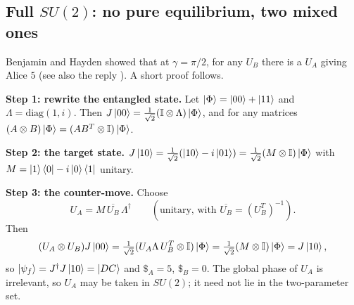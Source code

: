 \documentclass[11pt,a4paper]{article}
\begin{document}
\subsection{Full \texorpdfstring{$SU(2)$}{SU(2)}: no pure equilibrium, two mixed ones}\label{sec:fullsu2}
Benjamin and Hayden \cite{bh} showed that at $\gamma=\pi/2$, for any $U_B$ there is a $U_A$ giving Alice $5$ (see also the reply \cite{ewlreply}). A short proof follows.

\textbf{Step 1: rewrite the entangled state.} Let $\ket\Phi=\ket{00}+\ket{11}$ and $\Lambda=\mathrm{diag}(1,i)$. Then $J\ket{00}=\tfrac1{\sqrt2}(\mathbb I\otimes \Lambda)\ket\Phi$, and for any matrices $(A\otimes B)\ket\Phi=(AB^{T}\otimes\mathbb I)\ket\Phi$.

\textbf{Step 2: the target state.} $J\ket{10}=\tfrac1{\sqrt2}(\ket{10}-i\ket{01})=\tfrac1{\sqrt2}(M\otimes\mathbb I)\ket\Phi$ with $M=\ket1\bra0-i\ket0\bra1$ unitary.

\textbf{Step 3: the counter-move.} Choose
\[
U_A=M\,\overline{U_B}\,\Lambda^\dagger\qquad(\text{unitary, with }\overline{U_B}=(U_B^{T})^{-1}).
\]
Then
\[
(U_A\otimes U_B)J\ket{00}=\tfrac1{\sqrt2}(U_A\Lambda\,U_B^{T}\otimes\mathbb I)\ket\Phi=\tfrac1{\sqrt2}(M\otimes\mathbb I)\ket\Phi=J\ket{10},
\]
so $\ket{\psi_f}=J^\dagger J\ket{10}=\ket{DC}$ and $\$_A=5$, $\$_B=0$. The global phase of $U_A$ is irrelevant, so $U_A$ may be taken in $SU(2)$; it need not lie in the two-parameter set.
\end{document}
